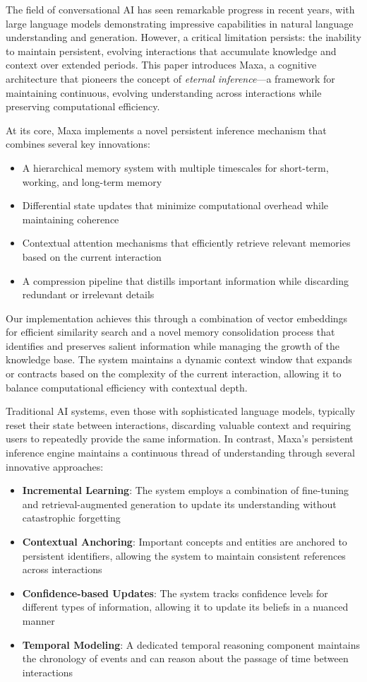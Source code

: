 The field of conversational AI has seen remarkable progress in recent years, with large language models demonstrating impressive capabilities in natural language understanding and generation. However, a critical limitation persists: the inability to maintain persistent, evolving interactions that accumulate knowledge and context over extended periods. This paper introduces Maxa, a cognitive architecture that pioneers the concept of \emph{eternal inference}—a framework for maintaining continuous, evolving understanding across interactions while preserving computational efficiency.

At its core, Maxa implements a novel persistent inference mechanism that combines several key innovations:
\begin{itemize}
    \item A hierarchical memory system with multiple timescales for short-term, working, and long-term memory
    \item Differential state updates that minimize computational overhead while maintaining coherence
    \item Contextual attention mechanisms that efficiently retrieve relevant memories based on the current interaction
    \item A compression pipeline that distills important information while discarding redundant or irrelevant details
\end{itemize}

Our implementation achieves this through a combination of vector embeddings for efficient similarity search and a novel memory consolidation process that identifies and preserves salient information while managing the growth of the knowledge base. The system maintains a dynamic context window that expands or contracts based on the complexity of the current interaction, allowing it to balance computational efficiency with contextual depth.

Traditional AI systems, even those with sophisticated language models, typically reset their state between interactions, discarding valuable context and requiring users to repeatedly provide the same information. In contrast, Maxa's persistent inference engine maintains a continuous thread of understanding through several innovative approaches:

\begin{itemize}
    \item \textbf{Incremental Learning}: The system employs a combination of fine-tuning and retrieval-augmented generation to update its understanding without catastrophic forgetting
    \item \textbf{Contextual Anchoring}: Important concepts and entities are anchored to persistent identifiers, allowing the system to maintain consistent references across interactions
    \item \textbf{Confidence-based Updates}: The system tracks confidence levels for different types of information, allowing it to update its beliefs in a nuanced manner
    \item \textbf{Temporal Modeling}: A dedicated temporal reasoning component maintains the chronology of events and can reason about the passage of time between interactions
\end{itemize}

